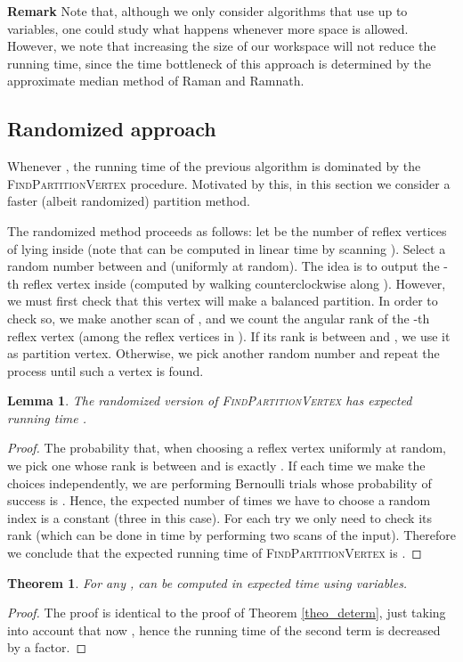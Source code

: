 \documentclass[a4paper]{article}
\newtheorem{lemma}{Lemma}
\newtheorem{theorem}{Theorem}
\begin{document}
{\bf Remark} Note that, although we only consider algorithms that use up to  variables, one could study what happens whenever more space is allowed. However, we note that increasing the size of our workspace will not reduce the running time, since the time bottleneck of this approach is determined by the approximate median method of Raman and Ramnath. 





\subsection{Randomized approach}\label{second}
Whenever , the running time of the previous algorithm is dominated by the \textsc{FindPartitionVertex} procedure. Motivated by this, in this section we consider a faster (albeit randomized) partition method. 

The randomized method proceeds as follows: let  be the  number of reflex vertices of  lying inside  (note that  can be computed in linear time by scanning ). Select a random number  between  and  (uniformly at random). The idea is to output the -th reflex vertex inside  (computed by walking counterclockwise along ). However, we must first check that this vertex will make a balanced partition. In order to check so, we make another scan of , and we count the angular rank of the -th reflex vertex (among the reflex vertices in ). If its rank is between  and  , we use it as partition vertex. Otherwise, we pick another random number and repeat the process until such a vertex is found.

\begin{lemma}\label{lem_runningtime}
The randomized version of \textsc{FindPartitionVertex} has expected running time .
\end{lemma}
\begin{proof}
The probability that, when choosing a reflex vertex uniformly at random, we pick one whose rank is between  and  is exactly . If each time we make the choices independently, we are performing Bernoulli trials whose probability of success is . Hence, the expected number of times we have to choose a random index is a constant (three in this case). For each try we only need to check its rank (which can be done in  time by performing two scans of the input).
Therefore we conclude that the expected running time of \textsc{FindPartitionVertex} is .
\end{proof}
 

\begin{theorem}\label{theo_randomi}
For any ,   can be computed in  expected time using  variables.
\end{theorem}
\begin{proof}
The proof is identical to the proof of Theorem \ref{theo_determ}, just taking into account that now , hence the running time of the second term is decreased by a  factor. 
\end{proof}
\end{document}
